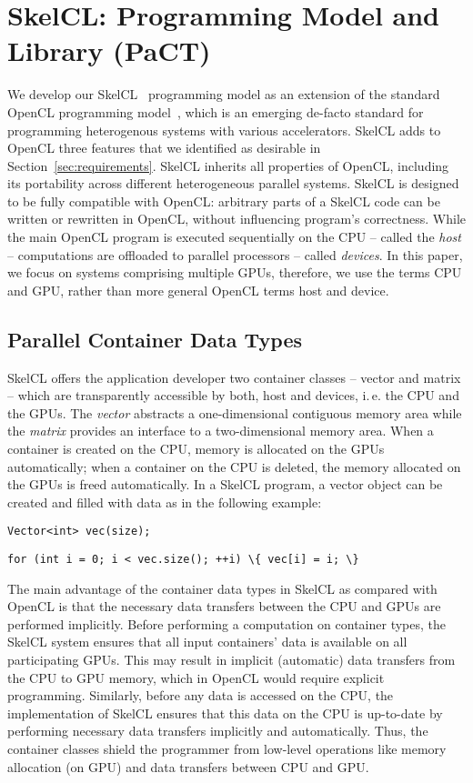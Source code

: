 \section{SkelCL: Programming Model and Library (PaCT)}
\label{sec:skelcl}

We develop our SkelCL~\cite{StKG-11} programming model as an extension of the standard OpenCL programming model~\cite{OpenCL-10}, which is an emerging de-facto standard for programming heterogenous systems with various accelerators.
SkelCL adds to OpenCL three features that we identified as desirable in Section~\ref{sec:requirements}.
SkelCL inherits all properties of OpenCL, including its portability across different heterogeneous parallel systems.
SkelCL is designed to be fully compatible with OpenCL: arbitrary parts of a SkelCL code can be written or rewritten in OpenCL, without influencing program's correctness.
While the main OpenCL program is executed sequentially on the CPU -- called the \emph{host} -- computations are offloaded to parallel processors -- called \emph{devices}.
In this paper, we focus on systems comprising multiple GPUs, therefore, we use the terms CPU and GPU, rather than more general OpenCL terms host and device.

\subsection{Parallel Container Data Types}
SkelCL offers the application developer two container classes -- vector and matrix -- which are transparently accessible by both, host and devices, i.\,e. the CPU and the GPUs.
The \emph{vector} abstracts a one-dimensional contiguous memory area while the \emph{matrix} provides an interface to a two-dimensional memory area.
When a container is created on the CPU, memory is allocated on the GPUs automatically;
when a container on the CPU is deleted, the memory allocated on the GPUs is freed automatically.
In a SkelCL program, a vector object can be created and filled with data as in the following example:

\vspace{.5em}
\centerline{\lstinline!Vector<int> vec(size);!}
\centerline{\lstinline!for (int i = 0; i < vec.size(); ++i) \{ vec[i] = i; \}!}
\vspace{.5em}

The main advantage of the container data types in SkelCL as compared with OpenCL is that the necessary data transfers between the CPU and GPUs are performed implicitly.
Before performing a computation on container types, the SkelCL system ensures that all input containers' data is available on all participating GPUs.
This may result in implicit (automatic) data transfers from the CPU to GPU memory, which in OpenCL would require explicit programming.
Similarly, before any data is accessed on the CPU, the implementation of SkelCL ensures that this data on the CPU is up-to-date by performing necessary data transfers implicitly and automatically.
Thus, the container classes shield the programmer from low-level operations like memory allocation (on GPU) and data transfers between CPU and GPU.

